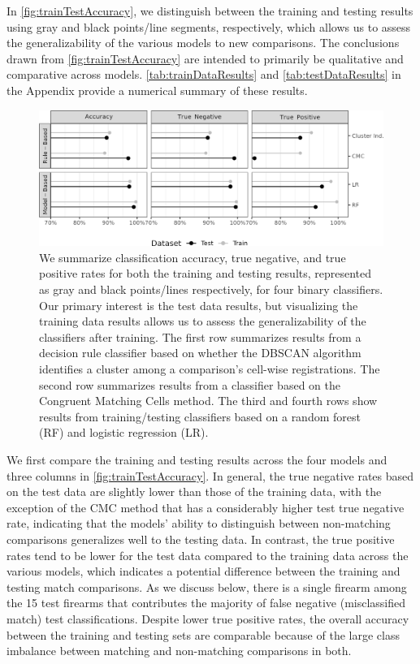 \documentclass[reprint]{JASA}
\begin{document}
In \autoref{fig:trainTestAccuracy}, we distinguish between the training
and testing results using gray and black points/line segments,
respectively, which allows us to assess the generalizability of the
various models to new comparisons. The conclusions drawn from
\autoref{fig:trainTestAccuracy} are intended to primarily be qualitative
and comparative across models. \autoref{tab:trainDataResults} and
\autoref{tab:testDataResults} in the Appendix provide a numerical
summary of these results.

\begin{figure}[htbp]

{\centering \includegraphics[width=\textwidth]{images/resultsPlots/classifResultsPlt_trainTest} 

}

\caption{\label{fig:trainTestAccuracy} We summarize classification accuracy, true negative, and true positive rates for both the training and testing results, represented as gray and black points/lines respectively, for four binary classifiers. Our primary interest is the test data results, but visualizing the training data results allows us to assess the generalizability of the classifiers after training. The first row summarizes results from a decision rule classifier based on whether the DBSCAN algorithm identifies a cluster among a comparison's cell-wise registrations. The second row summarizes results from a classifier based on the Congruent Matching Cells method. The third and fourth rows show results from training/testing classifiers based on a random forest (RF) and logistic regression (LR).}\label{fig:unnamed-chunk-9}
\end{figure}

We first compare the training and testing results across the four models
and three columns in \autoref{fig:trainTestAccuracy}. In general, the
true negative rates based on the test data are slightly lower than those
of the training data, with the exception of the CMC method that has a
considerably higher test true negative rate, indicating that the models'
ability to distinguish between non-matching comparisons generalizes well
to the testing data. In contrast, the true positive rates tend to be
lower for the test data compared to the training data across the various
models, which indicates a potential difference between the training and
testing match comparisons. As we discuss below, there is a single
firearm among the 15 test firearms that contributes the majority of
false negative (misclassified match) test classifications. Despite lower
true positive rates, the overall accuracy between the training and
testing sets are comparable because of the large class imbalance between
matching and non-matching comparisons in both.
\end{document}
